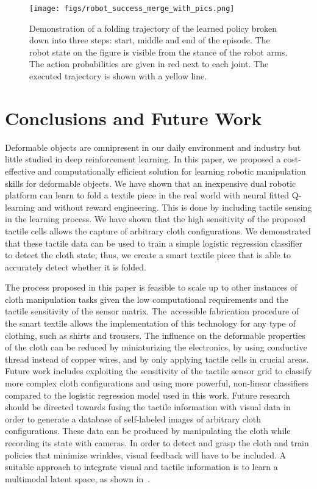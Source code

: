 \documentclass[applsci,article,accept,moreauthors,pdftex]{Definitions/mdpi}
\begin{document}
\begin{figure}[H]
\centering
\texttt{[image: figs/robot\_success\_merge\_with\_pics.png]}
\caption{Demonstration of a folding trajectory of the learned policy broken down into three steps: start, middle and end of the episode. The robot state on the figure is visible from the stance of the robot arms. The action probabilities are given in red next to each joint. The executed trajectory is shown with a yellow line.  }
\label{fig:robot_success_merge}
\end{figure}

\FloatBarrier

\section{Conclusions and Future Work} 
\label{sec:discussion}

Deformable objects are omnipresent in our daily environment and industry but little studied in deep reinforcement learning. In this paper, we proposed a cost-effective and computationally efficient solution for learning robotic manipulation skills for deformable objects. We have shown that an inexpensive dual robotic platform can learn to fold a textile piece in the real world with neural fitted Q-learning and without reward engineering. This is done by including tactile sensing in the learning process. We have shown that the high sensitivity of the proposed tactile cells allows the capture of arbitrary cloth configurations. We demonstrated that these tactile data can be used to train a simple logistic regression classifier to detect the cloth state; thus, we create a smart textile piece that is able to accurately detect whether it is folded.

The process proposed in this paper is feasible to scale up to other instances of cloth manipulation tasks given the low computational requirements and the tactile sensitivity of the sensor matrix. The~accessible fabrication procedure of the smart textile allows the implementation of this technology for any type of clothing, such as shirts and trousers. The influence on the deformable properties of the cloth can be reduced by miniaturizing the electronics, by using conductive thread instead of copper wires, and by only applying tactile cells in crucial areas. Future work includes exploiting the sensitivity of the tactile sensor grid to classify more complex cloth configurations and using more powerful, non-linear classifiers compared to the logistic regression model used in this work. Future research should be directed towards fusing the tactile information with visual data in order to generate a database of self-labeled images of arbitrary cloth configurations. These data can be produced by manipulating the cloth while recording its state with cameras. In order to detect and grasp the cloth and train policies that minimize wrinkles, visual feedback will have to be included. A suitable approach to integrate visual and tactile information is to learn a multimodal latent space, as shown in~\cite{Lee2019}.
\end{document}
